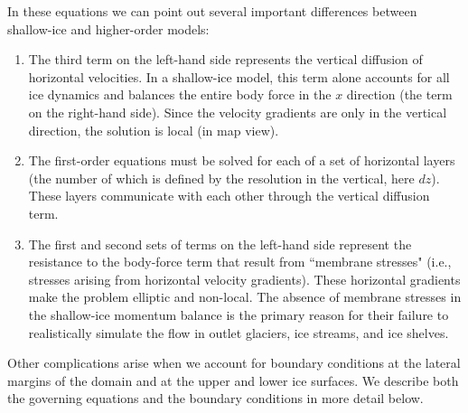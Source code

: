 In these equations we can point out several important differences between shallow-ice and higher-order models: 
\begin{enumerate}
\item  The third term on the left-hand side represents the vertical diffusion of horizontal velocities. In a shallow-ice model, this term alone accounts for all ice dynamics and balances the entire body force in the $x$ direction (the term on the right-hand side). Since the velocity gradients are only in the vertical direction, the solution is local (in map view).

\item  The first-order equations must be solved for each of a set of horizontal layers (the number of which is defined by the resolution in the vertical, here $dz$). These layers communicate with each other through the vertical diffusion term.

\item  The first and second sets of terms on the left-hand side represent the resistance to the body-force term that result from ``membrane stresses" (i.e., stresses arising from horizontal velocity gradients). These horizontal gradients make the problem elliptic and non-local. The absence of membrane stresses in the shallow-ice momentum balance is the primary reason for their failure to realistically simulate the flow in outlet glaciers, ice streams, and ice shelves.

\end{enumerate}

Other complications arise when we account for boundary conditions at the lateral margins of the domain and at the upper and lower ice surfaces. We describe both the governing equations and the boundary conditions in more detail below.


